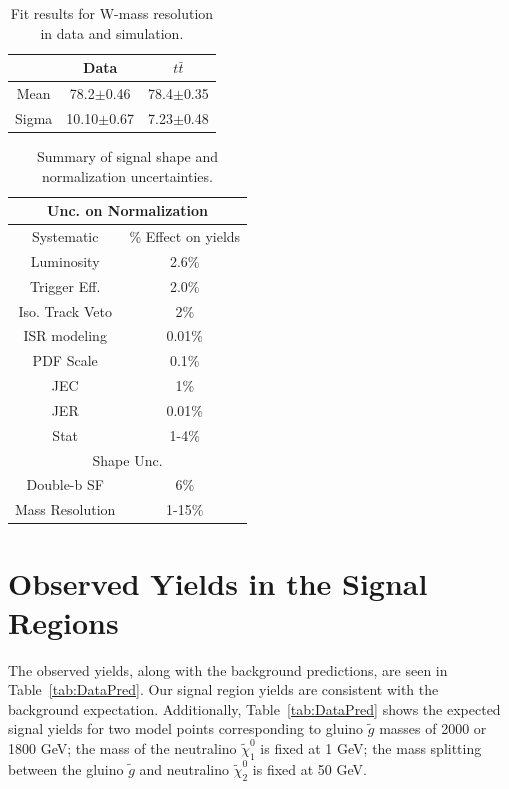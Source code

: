 \begin{table}
\caption{Fit results for W-mass resolution in data and simulation.}
\label{tab:WMassFit}
\centering
\begin{tabular}{c||c|c}
\hline
\hline
 & Data & $t\bar{t}$\\
\hline
Mean & 78.2$\pm$0.46 & 78.4$\pm$0.35\\
Sigma & 10.10$\pm$0.67 & 7.23$\pm$0.48\\
\hline
\hline
\end{tabular}
\end{table}

\begin{table}
\centering
\begin{tabular}{c|c}
\hline \hline
\multicolumn{2}{c}{Unc. on Normalization} \\  \hline
\hline \hline
Systematic & \% Effect on yields\\ \hline
Luminosity & 2.6\% \\ \hline
Trigger Eff. & 2.0\% \\ \hline
Iso. Track Veto & 2\%\\ \hline
ISR modeling & 0.01\% \\ \hline
PDF Scale & 0.1\% \\ \hline
JEC & 1\% \\ \hline
JER & 0.01\% \\ \hline
 Stat & 1-4\% \\ \hline
\multicolumn{2}{c}{Shape Unc.} \\  \hline
Double-b SF & 6\% \\ \hline
Mass Resolution &1-15\% \\ \hline
\hline
\end{tabular}
\caption{
    Summary of signal shape and normalization uncertainties. 
}
\label{tab:SignalSystSummary}
\end{table}

\section{Observed Yields in the Signal Regions}
\label{sec:results}

The observed yields, along with the background predictions, are seen in Table~\ref{tab:DataPred}. Our signal region yields are consistent with the background expectation. Additionally, Table~\ref{tab:DataPred} shows the expected signal yields for two model points corresponding to gluino $\tilde{g}$ masses of 2000 or 1800 GeV; the mass of the neutralino $\tilde{\chi}_{1}^{0}$ is fixed at 1 GeV; the mass splitting between the gluino $\tilde{g}$ and neutralino $\tilde{\chi}_{2}^{0}$ is fixed at 50 GeV.

